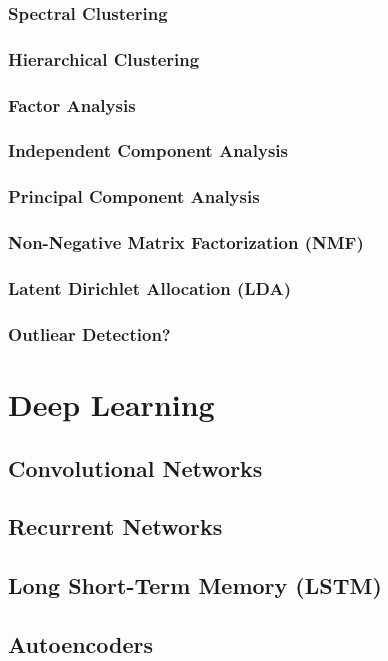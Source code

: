 \documentclass[11pt]{article}
\begin{document}
\subsubsection{Spectral Clustering}
\subsubsection{Hierarchical Clustering}
\subsubsection{Factor Analysis}
\subsubsection{Independent Component Analysis}
\subsubsection{Principal Component Analysis}
\subsubsection{Non-Negative Matrix Factorization (NMF)}
\subsubsection{Latent Dirichlet Allocation (LDA)}
\subsubsection{Outliear Detection?}

\section{Deep Learning}
\subsection{Convolutional Networks}
\subsection{Recurrent Networks}
\subsection{Long Short-Term Memory (LSTM)}
\subsection{Autoencoders}
\end{document}
